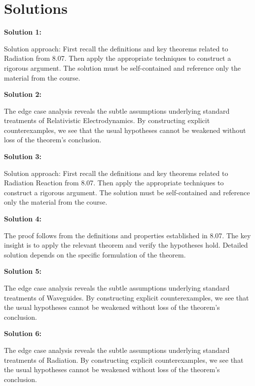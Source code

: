 \documentclass[12pt,a4paper]{exam}
\begin{document}
\newpage
\section*{Solutions}

\textbf{Solution 1:}

Solution approach: First recall the definitions and key theorems related to Radiation from 8.07. Then apply the appropriate techniques to construct a rigorous argument. The solution must be self-contained and reference only the material from the course.

\vspace{0.5cm}

\textbf{Solution 2:}

The edge case analysis reveals the subtle assumptions underlying standard treatments of Relativistic Electrodynamics. By constructing explicit counterexamples, we see that the usual hypotheses cannot be weakened without loss of the theorem's conclusion.

\vspace{0.5cm}

\textbf{Solution 3:}

Solution approach: First recall the definitions and key theorems related to Radiation Reaction from 8.07. Then apply the appropriate techniques to construct a rigorous argument. The solution must be self-contained and reference only the material from the course.

\vspace{0.5cm}

\textbf{Solution 4:}

The proof follows from the definitions and properties established in 8.07. The key insight is to apply the relevant theorem and verify the hypotheses hold. Detailed solution depends on the specific formulation of the theorem.

\vspace{0.5cm}

\textbf{Solution 5:}

The edge case analysis reveals the subtle assumptions underlying standard treatments of Waveguides. By constructing explicit counterexamples, we see that the usual hypotheses cannot be weakened without loss of the theorem's conclusion.

\vspace{0.5cm}

\textbf{Solution 6:}

The edge case analysis reveals the subtle assumptions underlying standard treatments of Radiation. By constructing explicit counterexamples, we see that the usual hypotheses cannot be weakened without loss of the theorem's conclusion.
\end{document}
